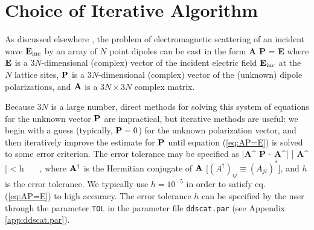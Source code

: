 \section{Choice of Iterative Algorithm\label{sec:choice_of_algorithm}}
As discussed elsewhere \citep[e.g.,][]{Draine_1988,Draine+Flatau_1994}, 
the problem of
electromagnetic scattering of an incident wave ${\bf E}_{\rm inc}$ by an
array of $N$ point dipoles can be cast in the form
\beq
{\bf A} {\bf P} = {\bf E}
\label{eq:AP=E}
\eeq
where ${\bf E}$ is a $3N$-dimensional (complex) vector of the incident
electric field ${\bf E}_{\rm inc}$ at the $N$ lattice sites, ${\bf P}$ is
a $3N$-dimensional (complex) vector of the (unknown) dipole
polarizations, and ${\bf A}$ is a $3N\times3N$ complex matrix.

Because $3N$ is a large number, direct methods for solving this system
of equations for the unknown vector ${\bf P}$ are impractical, but
iterative methods are useful: we begin with a guess (typically, ${\bf
P}=0$) for the unknown polarization vector, and then iteratively
improve the estimate for ${\bf P}$ until equation (\ref{eq:AP=E}) is
solved to some error criterion.  The error tolerance may be specified
as
\beq
{|{\bf A}^ {\bf P} - {\bf A}^| \over
| {\bf A}^ |}
 < h 
\label{eq:err_tol}~~~,
\eeq
where ${\bf A}^\dagger$ is the Hermitian conjugate of ${\bf A}$
[$(A^\dagger)_{ij} \equiv (A_{ji})^*$], and $h$ is the error
tolerance.  We typically use $h=10^{-5}$ in order to satisfy
eq.(\ref{eq:AP=E}) to high accuracy.  The error tolerance $h$ can be
specified by the user through the parameter {\tt TOL} in
the parameter file {\tt ddscat.par} (see Appendix \ref{app:ddscat.par}).

